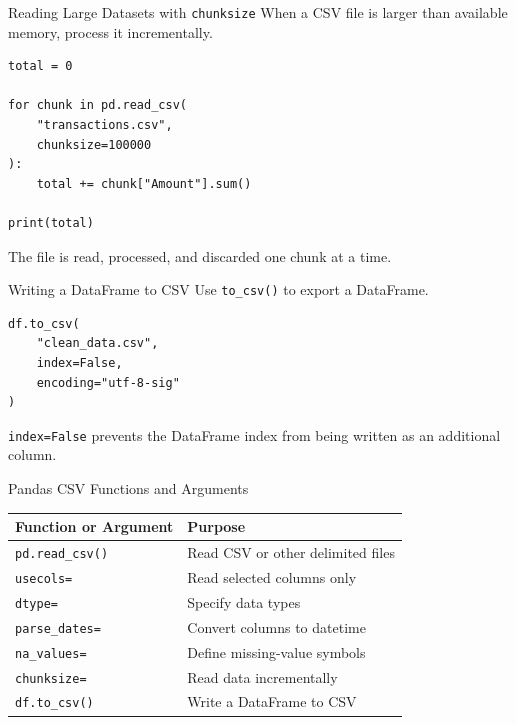 \documentclass[aspectratio=169,11pt]{beamer}
\newcommand{\code}[1]{\texttt{#1}}
\begin{document}
\begin{frame}[fragile]{Reading Large Datasets with \code{chunksize}}
When a CSV file is larger than available memory, process it incrementally.

\begin{lstlisting}[style=pythonstyle]
total = 0

for chunk in pd.read_csv(
    "transactions.csv",
    chunksize=100000
):
    total += chunk["Amount"].sum()

print(total)
\end{lstlisting}

The file is read, processed, and discarded one chunk at a time.
\end{frame}

\begin{frame}[fragile]{Writing a DataFrame to CSV}
Use \code{to\_csv()} to export a DataFrame.

\begin{lstlisting}[style=pythonstyle]
df.to_csv(
    "clean_data.csv",
    index=False,
    encoding="utf-8-sig"
)
\end{lstlisting}

\code{index=False} prevents the DataFrame index from being written as an additional column.
\end{frame}

\begin{frame}{Pandas CSV Functions and Arguments}
\begin{tabularx}{\textwidth}{lX}
\toprule
\textbf{Function or Argument} & \textbf{Purpose} \\
\midrule
\code{pd.read\_csv()} & Read CSV or other delimited files \\
\code{usecols=} & Read selected columns only \\
\code{dtype=} & Specify data types \\
\code{parse\_dates=} & Convert columns to datetime \\
\code{na\_values=} & Define missing-value symbols \\
\code{chunksize=} & Read data incrementally \\
\code{df.to\_csv()} & Write a DataFrame to CSV \\
\bottomrule
\end{tabularx}
\end{frame}
\end{document}
